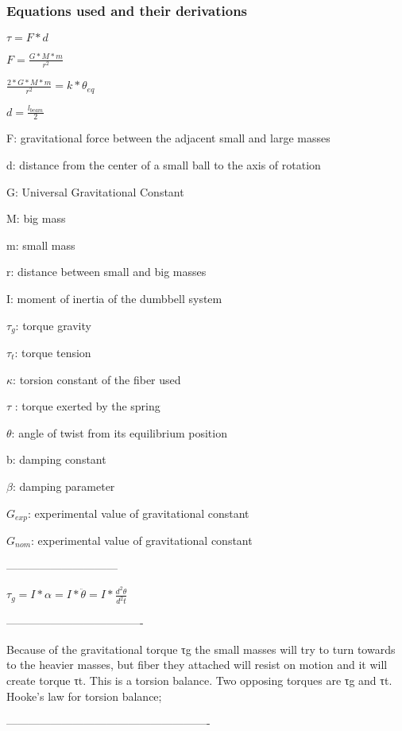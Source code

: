 \documentclass[12pt]{article}
\begin{document}
\subsubsection{Equations used and their derivations}
\begin{center}
 $\tau = F * d$
 \par

 $ F = \frac{G * M * m}{r^2}$
 \par
 $\frac{2 * G * M * m}{r^2} = k * \theta_{eq}$
 \par
 $d =\frac{l_{beam}}{2}$
 \par
 F: gravitational force between the adjacent small
and large masses
\par
d: distance from the center of a small ball to the
axis of rotation
\par
G: Universal Gravitational Constant
\par
M: big mass
\par
m: small mass
\par
r: distance between small and big masses
\par
I: moment of inertia of the dumbbell system
\par
$\tau_{g}$: torque gravity
\par
$\tau_{t}$: torque tension
\par
$\kappa$: torsion constant of the fiber used
\par
$\tau$ : torque exerted by the spring
\par
$\theta$: angle of twist from its equilibrium position
\par
b: damping constant
\par
$\beta$: damping parameter
\par
$G_{exp}$: experimental value of gravitational constant
\par
$G_{nom}$: experimental value of gravitational constant
\par
------------------------------
\par
$\tau_{g} = I * \alpha = I * \ddot{\theta} = I * \frac{d^{2}\theta}{d^{2}t}$
\par
-------------------------------------
\par
Because of the gravitational torque τg the small
masses will try to turn towards to the heavier masses,
but fiber they attached will resist on motion and it
will create torque τt. This is a torsion balance. Two
opposing torques are τg and τt. Hooke’s law for torsion balance;
\par
-------------------------------------------------------

\end{center}
\end{document}
